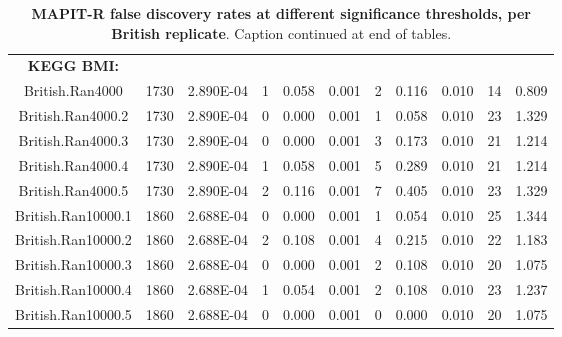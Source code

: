 \documentclass[12pt,a4paper]{article}
\begin{document}
\begin{landscape}
\begin{table}[ht]
\begin{tabular}{ccccccccccc}
  \\
  \textbf{KEGG BMI:} & & & & & & & & & \\
British.Ran4000 & 1730 & 2.890E-04 & 1 & 0.058 & 0.001 & 2 & 0.116 & 0.010 & 14 & 0.809 \\
  British.Ran4000.2 & 1730 & 2.890E-04 & 0 & 0.000 & 0.001 & 1 & 0.058 & 0.010 & 23 & 1.329 \\
  British.Ran4000.3 & 1730 & 2.890E-04 & 0 & 0.000 & 0.001 & 3 & 0.173 & 0.010 & 21 & 1.214 \\
  British.Ran4000.4 & 1730 & 2.890E-04 & 1 & 0.058 & 0.001 & 5 & 0.289 & 0.010 & 21 & 1.214 \\
  British.Ran4000.5 & 1730 & 2.890E-04 & 2 & 0.116 & 0.001 & 7 & 0.405 & 0.010 & 23 & 1.329 \\
  British.Ran10000.1 & 1860 & 2.688E-04 & 0 & 0.000 & 0.001 & 1 & 0.054 & 0.010 & 25 & 1.344 \\
  British.Ran10000.2 & 1860 & 2.688E-04 & 2 & 0.108 & 0.001 & 4 & 0.215 & 0.010 & 22 & 1.183 \\
  British.Ran10000.3 & 1860 & 2.688E-04 & 0 & 0.000 & 0.001 & 2 & 0.108 & 0.010 & 20 & 1.075 \\
  British.Ran10000.4 & 1860 & 2.688E-04 & 1 & 0.054 & 0.001 & 2 & 0.108 & 0.010 & 23 & 1.237 \\
  British.Ran10000.5 & 1860 & 2.688E-04 & 0 & 0.000 & 0.001 & 0 & 0.000 & 0.010 & 20 & 1.075 \\
   \hline
\end{tabular}
\caption[TBD]{\textbf{MAPIT-R false discovery rates at different significance thresholds, per British replicate}. Caption continued at end of tables.}
\label{InterPath-Supp-Tables-BritReps-FDRs-pt1}
\end{table}
\end{landscape}
\clearpage
\setlength{\footskip}{1cm}
\addtocounter{table}{-1}
\end{document}
